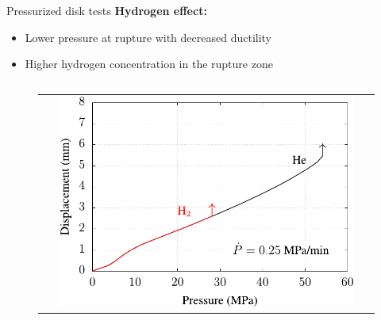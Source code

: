 \documentclass[9pt]{beamer}
\begin{document}

\begin{frame}{Pressurized disk tests}
    \textbf{Hydrogen effect:}

    \vspace{0.2cm}

    \begin{itemize}
        \item Lower pressure at rupture with decreased ductility
        \vspace{0.15cm}
        \item Higher hydrogen concentration in the rupture zone
    \end{itemize}

    \vspace{0.1cm}

    \begin{columns}

        \begin{column}{0.45\textwidth}

            \begin{figure}
                \begin{tabular}{c}
                    \includegraphics[width=0.9\textwidth]{Images/fig_disk_tP.pdf}\\
                \end{tabular}
            \end{figure}

        \end{column}
    

\end{columns}
\end{frame}
\end{document}
